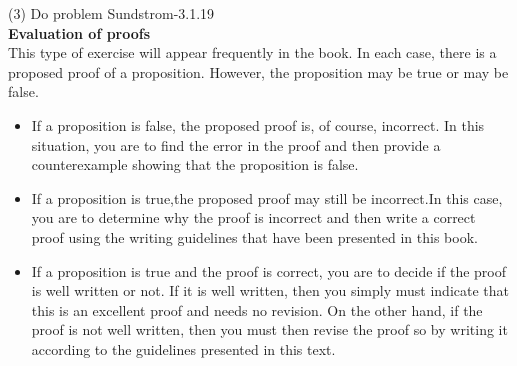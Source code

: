 \documentclass{article}
\begin{document}
(3) Do problem Sundstrom-3.1.19\\
\textbf{Evaluation of proofs}\\
This type of exercise will appear frequently in the book. In each case, there is a proposed proof of a proposition. However, the proposition may be true or may be false.

\begin{itemize}
\item If a proposition is false, the proposed proof is, of course, incorrect. In this situation, you are to find the error in the proof and then provide a counterexample showing that the proposition is false.

\item If a proposition is true,the proposed proof may still be incorrect.In this case, you are to determine why the proof is incorrect and then write a correct proof using the writing guidelines that have been presented in this book.

\item If a proposition is true and the proof is correct, you are to decide if the proof is well written or not. If it is well written, then you simply must indicate that this is an excellent proof and needs no revision. On the other hand, if the proof is not well written, then you must then revise the proof so by writing it according to the guidelines presented in this text.
\end{itemize}\par
\end{document}
